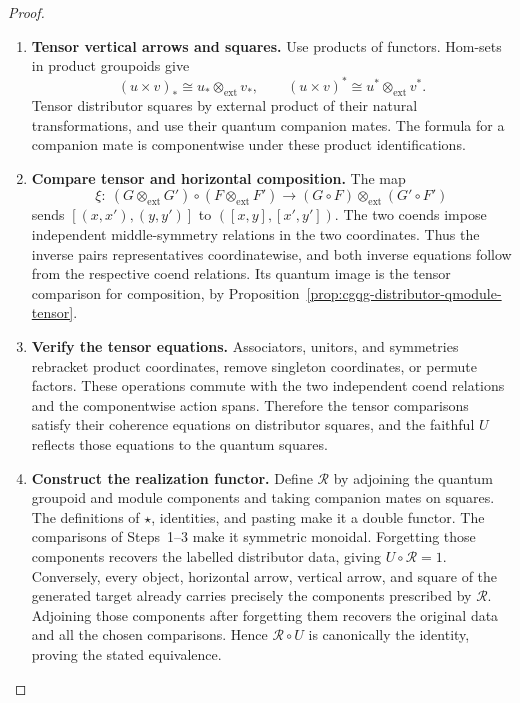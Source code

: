 \documentclass[oneside]{article}
\newcommand{\extprod}{\mathbin{\otimes_{\mathrm{ext}}}}
\theoremstyle{plain}
\theoremstyle{definition}
\theoremstyle{remark}
\begin{document}
\begin{proof}
    \leavevmode
    \begin{enumerate}[beginpenalty=10000]
        \item \textbf{Tensor vertical arrows and squares.}
        Use products of functors. Hom-sets in product groupoids give
        \[
        (u\times v)_*\cong u_*\extprod v_*,
        \qquad
        (u\times v)^*\cong u^*\extprod v^*.
        \]
        Tensor distributor squares by external product of their natural
        transformations, and use their quantum companion mates.
        The formula for a companion mate is componentwise under these
        product identifications.

        \item \textbf{Compare tensor and horizontal composition.}
        The map
        \[
        \xi:\ (G\extprod G')\circ(F\extprod F')
          \longrightarrow(G\circ F)\extprod(G'\circ F')
        \]
        sends \([(x,x'),(y,y')]\) to \(([x,y],[x',y'])\).
        The two coends impose independent middle-symmetry relations
        in the two coordinates. Thus the inverse pairs representatives
        coordinatewise, and both inverse equations follow from the
        respective coend relations. Its quantum image is the tensor
        comparison for composition, by
        Proposition~\ref{prop:cgqg-distributor-qmodule-tensor}.

        \item \textbf{Verify the tensor equations.}
        Associators, unitors, and symmetries rebracket product coordinates,
        remove singleton coordinates, or permute factors. These operations
        commute with the two independent coend relations and the
        componentwise action spans. Therefore the tensor comparisons
        satisfy their coherence equations on distributor squares, and the
        faithful \(U\) reflects those equations to the quantum squares.

        \item \textbf{Construct the realization functor.}
        Define \(\mathcal R\) by adjoining the quantum groupoid and module
        components and taking companion mates on squares. The definitions
        of \(\star\), identities, and pasting make it a double functor.
        The comparisons of Steps~1--3 make it symmetric monoidal.
        Forgetting those components recovers the labelled distributor
        data, giving \(U\circ\mathcal R=1\). Conversely, every object,
        horizontal arrow, vertical arrow, and square of the generated
        target already carries precisely the components prescribed by
        \(\mathcal R\). Adjoining those components after forgetting
        them recovers the original data and all the chosen comparisons.
        Hence \(\mathcal R\circ U\) is canonically the identity, proving
        the stated equivalence. \qedhere
    \end{enumerate}
\end{proof}
\end{document}

